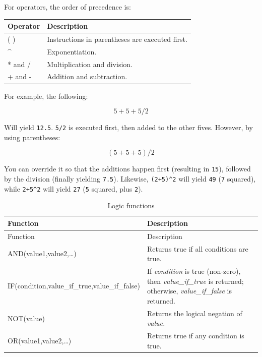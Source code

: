 \documentclass[
]{book}
\theoremstyle{definition}
\theoremstyle{definition}
\theoremstyle{definition}
\theoremstyle{definition}
\theoremstyle{remark}
\begin{document}
\begin{minipage}{\textwidth}

For operators, the order of precedence is:

\begin{longtable}[]{@{}ll@{}}
\toprule
Operator & Description \\
\midrule
\endhead
( ) & Instructions in parentheses are executed first. \\
\^{} & Exponentiation. \\
* and / & Multiplication and division. \\
+ and - & Addition and subtraction. \\
\bottomrule
\end{longtable}

\end{minipage}

For example, the following:

\[
5+5+5/2
\]

Will yield \texttt{12.5}. \texttt{5/2} is executed first, then added to the other fives. However, by using parentheses:

\[
(5+5+5)/2
\]

You can override it so that the additions happen first (resulting in \texttt{15}), followed by the division (finally yielding \texttt{7.5}). Likewise, \texttt{(2+5)\^{}2} will yield \texttt{49} (\texttt{7} squared), while \texttt{2+5\^{}2} will yield \texttt{27} (\texttt{5} squared, plus \texttt{2}).

\begin{minipage}{\textwidth}

\begin{longtable}[]{@{}
  >{\raggedright\arraybackslash}p{}
  >{\raggedright\arraybackslash}p{}@{}}
\caption{Logic functions}\tabularnewline
\toprule
Function & Description \\
\midrule
\endfirsthead
\toprule
Function & Description \\
\midrule
\endhead
AND(value1,value2,\ldots) & Returns true if all conditions are true. \\
IF(condition,value\_if\_true,value\_if\_false) & If \emph{condition} is true (non-zero), then \emph{value\_if\_true} is returned; otherwise, \emph{value\_if\_false} is returned. \\
NOT(value) & Returns the logical negation of \emph{value.} \\
OR(value1,value2,\ldots) & Returns true if any condition is true. \\
\bottomrule
\end{longtable}

\end{minipage}
\end{document}
